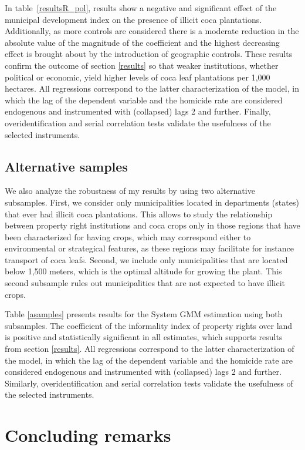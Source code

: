 \documentclass[12pt,a4paper,english]{article}%
\begin{document}
In table~\ref{resultsR_pol}, results show a negative and significant effect of the municipal development index on the presence of illicit coca plantations. Additionally, as more controls are considered there is a moderate reduction in the absolute value of the magnitude of the coefficient and the highest decreasing effect is brought about by the introduction of geographic controls. These results confirm the outcome of section \ref{results} so that weaker institutions, whether political or economic, yield higher levels of coca leaf plantations per 1,000 hectares. All regressions correspond to the latter characterization of the model, in which the lag of the dependent variable and the homicide rate are considered endogenous and instrumented with (collapsed) lags 2 and further. Finally, overidentification and serial correlation tests validate the usefulness of the selected instruments.

\subsection{Alternative samples}

We also analyze the robustness of my results by using two alternative subsamples. First, we consider only municipalities located in departments (states) that ever had illicit coca plantations. This allows to study the relationship between property right institutions and coca crops only in those regions that have been characterized for having crops, which may correspond either to environmental or strategical features, as these regions may facilitate for instance transport of coca leafs. Second, we include only municipalities that are located below 1,500 meters, which is the optimal altitude for growing the plant. This second subsample rules out municipalities that are not expected to have illicit crops.

Table \ref{asamples} presents results for the System GMM estimation using both subsamples. The coefficient of the informality index of property rights over land is positive and statistically significant in all estimates, which supports results from section \ref{results}. All regressions correspond to the latter characterization of the model, in which the lag of the dependent variable and the homicide rate are considered endogenous and instrumented with (collapsed) lags 2 and further. Similarly, overidentification and serial correlation tests validate the usefulness of the selected instruments.

\section{Concluding remarks}
\end{document}
